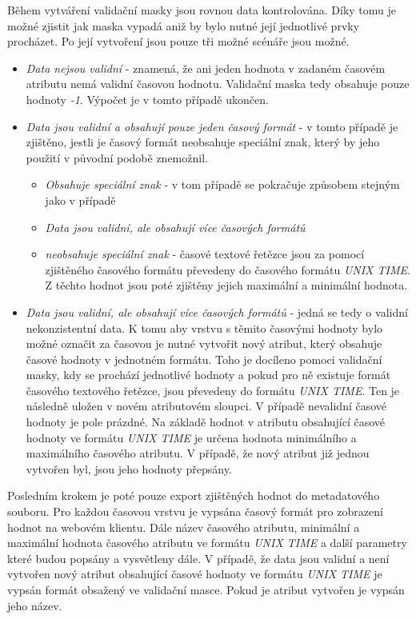 Během vytváření validační masky jsou rovnou data kontrolována. Díky tomu je možné zjistit jak maska vypadá aniž by bylo nutné její jednotlivé prvky procházet. Po její vytvoření jsou pouze tři možné scénáře jsou možné.

\begin{itemize}
	\item\textit{Data nejsou validní} - znamená, že ani jeden hodnota v zadaném časovém atributu nemá validní časovou hodnotu. Validační maska tedy obsahuje pouze hodnoty \textit{-1}. Výpočet je v tomto případě ukončen.
	\item\textit{Data jsou validní a obsahují pouze jeden časový formát} - v tomto případě je zjištěno, jestli je časový formát neobsahuje speciální znak, který by jeho použití v původní podobě znemožnil.
	\begin{itemize}
		\item\textit{Obsahuje speciální znak} - v tom případě se pokračuje způsobem stejným jako v případě \item\textit{Data jsou validní, ale obsahují více časových formátů}
		\item\textit{neobsahuje speciální znak} - časové textové řetězce jsou za pomocí zjištěného časového formátu převedeny do časového formátu \textit{UNIX TIME}. Z těchto hodnot jsou poté zjištěny jejich maximální a minimální hodnota.
	\end{itemize}
	\item\textit{Data jsou validní, ale obsahují více časových formátů} - jedná se tedy o validní nekonzistentní data. K tomu aby vrstvu s těmito časovými hodnoty bylo možné označit za časovou je nutné vytvořit nový atribut, který obsahuje časové hodnoty v jednotném formátu. Toho je docíleno pomoci validační masky, kdy se prochází jednotlivé hodnoty a pokud pro ně existuje formát časového textového řetězce, jsou převedeny do formátu \textit{UNIX TIME}. Ten je následně uložen v novém atributovém sloupci. V případě nevalidní časové hodnoty je pole prázdné. Na základě hodnot v atributu obsahující časové hodnoty ve formátu \textit{UNIX TIME} je určena hodnota minimálního a maximálního časového atributu.
	V případě, že nový atribut již jednou vytvořen byl, jsou jeho hodnoty přepsány.
\end{itemize}

Posledním krokem je poté pouze export zjištěných hodnot do metadatového souboru. Pro každou časovou vrstvu je vypsána časový formát pro zobrazení hodnot na webovém klientu. Dále název časového atributu, minimální a maximální hodnota časového atributu ve formátu \textit{UNIX TIME} a další parametry které budou popsány a vysvětleny dále. V případě, že data jsou validní a není vytvořen nový atribut obsahující časové hodnoty ve formátu \textit{UNIX TIME} je vypsán formát obsažený ve validační masce. Pokud je atribut vytvořen je vypsán jeho název.

